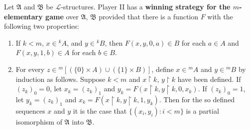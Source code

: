 Let $\mathfrak{A}$ and $\mathfrak{B}$ be $\mathcal{L}$-structures. Player II has a \textbf{winning strategy for the $m$-elementary game} over $\mathfrak{A}$, $\mathfrak{B}$ provided that there is a function $F$ with the following two properties:

\begin{enumerate}
\item[(i)] If $k < m$, $x \in {}^k A$, and $y \in {}^k B$, then $F(x, y, 0, a) \in B$ for each $a \in A$ and $F(x, y, 1, b) \in A$ for each $b \in B$.

\item[(ii)] For every $z \in {}^m [(\{0\} \times A) \cup (\{1\} \times B)]$, define $x \in {}^m A$ and $y \in {}^m B$ by induction as follows. Suppose $k < m$ and $x \upharpoonright k$, $y \upharpoonright k$ have been defined. If $(z_k)_0 = 0$, let $x_k = (z_k)_1$ and $y_k = F(x \upharpoonright k, y \upharpoonright k, 0, x_k)$. If $(z_k)_0 = 1$, let $y_k = (z_k)_1$ and $x_k = F(x \upharpoonright k, y \upharpoonright k, 1, y_k)$. Then for the so defined sequences $x$ and $y$ it is the case that $\{(x_i, y_i) : i < m\}$ is a partial isomorphism of $\mathfrak{A}$ into $\mathfrak{B}$.
\end{enumerate}
